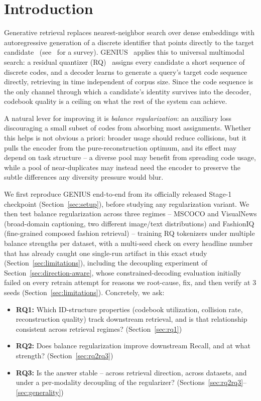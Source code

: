 \section{Introduction}
\label{sec:intro}

Generative retrieval replaces nearest-neighbor search over dense embeddings with autoregressive generation of a discrete identifier that points directly to the target candidate~\cite{tay2022dsi} (see~\cite{li2024survey} for a survey). GENIUS~\cite{kim2025genius} applies this to universal multimodal search: a residual quantizer (RQ)~\cite{lee2022rqvae} assigns every candidate a short sequence of discrete codes, and a decoder learns to generate a query's target code sequence directly, retrieving in time independent of corpus size. Since the code sequence is the only channel through which a candidate's identity survives into the decoder, codebook quality is a ceiling on what the rest of the system can achieve.

A natural lever for improving it is \emph{balance regularization}: an auxiliary loss discouraging a small subset of codes from absorbing most assignments. Whether this helps is not obvious a priori: broader usage should reduce collisions, but it pulls the encoder from the pure-reconstruction optimum, and its effect may depend on task structure -- a diverse pool may benefit from spreading code usage, while a pool of near-duplicates may instead need the encoder to preserve the subtle differences any diversity pressure would blur.

We first reproduce GENIUS end-to-end from its officially released Stage-1 checkpoint (Section~\ref{sec:setup}), before studying any regularization variant. We then test balance regularization across three regimes -- MSCOCO and VisualNews (broad-domain captioning, two different image/text distributions) and FashionIQ (fine-grained composed fashion retrieval) -- training RQ tokenizers under multiple balance strengths per dataset, with a multi-seed check on every headline number that has already caught one single-run artifact in this exact study (Section~\ref{sec:limitations}), including the decoupling experiment of Section~\ref{sec:direction-aware}, whose constrained-decoding evaluation initially failed on every retrain attempt for reasons we root-cause, fix, and then verify at 3 seeds (Section~\ref{sec:limitations}). Concretely, we ask:

\begin{itemize}
\item \textbf{RQ1:} Which ID-structure properties (codebook utilization, collision rate, reconstruction quality) track downstream retrieval, and is that relationship consistent across retrieval regimes? (Section~\ref{sec:rq1})
\item \textbf{RQ2:} Does balance regularization improve downstream Recall, and at what strength? (Section~\ref{sec:rq2rq3})
\item \textbf{RQ3:} Is the answer stable -- across retrieval direction, across datasets, and under a per-modality decoupling of the regularizer? (Sections~\ref{sec:rq2rq3}--\ref{sec:generality})
\end{itemize}

